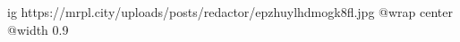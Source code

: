  
 
 
 
 

\ifcmt
  ig https://mrpl.city/uploads/posts/redactor/epzhuylhdmogk8fl.jpg
  @wrap center
  @width 0.9
\fi
